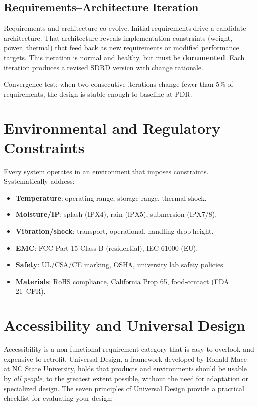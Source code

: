 \subsection{Requirements--Architecture Iteration}
Requirements and architecture co-evolve. Initial requirements drive a candidate architecture. That architecture reveals implementation constraints (weight, power, thermal) that feed back as new requirements or modified performance targets. This iteration is normal and healthy, but must be \textbf{documented}. Each iteration produces a revised SDRD version with change rationale.

Convergence test: when two consecutive iterations change fewer than 5\% of requirements, the design is stable enough to baseline at PDR.


\section{Environmental and Regulatory Constraints}
Every system operates in an environment that imposes constraints. Systematically address:
\begin{itemize}[nosep,leftmargin=1.5em]
\item \textbf{Temperature}: operating range, storage range, thermal shock.
\item \textbf{Moisture/IP}: splash (IPX4), rain (IPX5), submersion (IPX7/8).
\item \textbf{Vibration/shock}: transport, operational, handling drop height.
\item \textbf{EMC}: FCC Part 15 Class B (residential), IEC 61000 (EU).
\item \textbf{Safety}: UL/CSA/CE marking, OSHA, university lab safety policies.
\item \textbf{Materials}: RoHS compliance, California Prop 65, food-contact (FDA 21~CFR).
\end{itemize}

\section{Accessibility and Universal Design}
Accessibility is a non-functional requirement category that is easy to overlook and expensive to retrofit. Universal Design, a framework developed by Ronald Mace at NC State University, holds that products and environments should be usable by \emph{all people}, to the greatest extent possible, without the need for adaptation or specialized design. The seven principles of Universal Design provide a practical checklist for evaluating your design:

